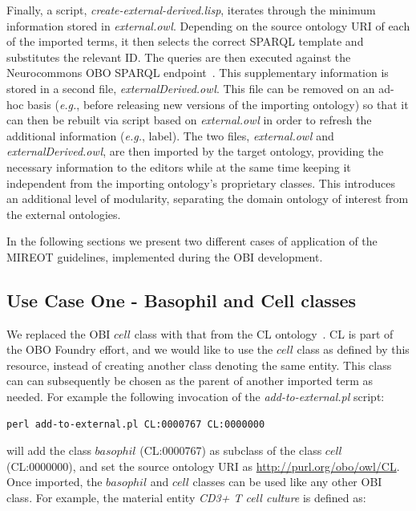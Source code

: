 \documentclass[jou]{ao2e}%
\begin{document}
Finally, a script, \emph{create-external-derived.lisp}, iterates through the minimum information stored in \emph{external.owl}.
Depending on the source ontology URI of each of the imported terms, it then selects the correct SPARQL template and substitutes the relevant ID.
The queries are then executed against the Neurocommons OBO SPARQL endpoint~\citep{NeurocommonsSparql,Neurocommons}. This supplementary information is stored in a second file, \emph{externalDerived.owl}.
This file can be removed on an ad-hoc basis (\emph{e.g.}, before releasing new versions of the importing ontology) so that it can then be rebuilt via script based on \emph{external.owl} in order to refresh the additional information (\emph{e.g.}, label). The two files, \emph{external.owl} and \emph{externalDerived.owl}, are then imported by the target ontology, providing the necessary information to the editors while at the same time keeping it independent from the importing ontology's proprietary classes. This introduces an additional level of modularity, separating the domain ontology of interest from the external ontologies.

In the following sections we present two different cases of application of the \ac{MIREOT} guidelines, implemented during the \ac{OBI} development.





\subsection{Use Case One - Basophil and Cell classes}

We replaced the \ac{OBI} $cell$ class with that from the \ac{CL} ontology~\citep{CL}. 
\ac{CL} is part of the \ac{OBO} Foundry effort, and we would like to use the $cell$ class as defined by this resource, instead of creating another class denoting the same entity.
This class can can subsequently be chosen as the parent of another imported term as needed.
For example the following invocation of the \emph{add-to-external.pl} script:

\begin{footnotesize}
\begin{verbatim}
perl add-to-external.pl CL:0000767 CL:0000000 
\end{verbatim}
\end{footnotesize}

will add the class $basophil$ (CL:0000767) as subclass of the class $cell$  (CL:0000000), and set the source ontology URI as \url{http://purl.org/obo/owl/CL}.
Once imported, the $basophil$ and $cell$ classes can be used like any other OBI class. For example, the material entity \emph{CD3+ T cell culture} is defined as:
\end{document}
